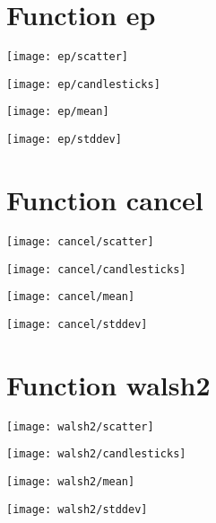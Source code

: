 \section{Function ep}
\begin{center}
\texttt{[image: ep/scatter]}
\end{center}
\begin{center}
\texttt{[image: ep/candlesticks]}
\end{center}
\begin{center}

\end{center}
\begin{center}
\texttt{[image: ep/mean]}
\end{center}
\begin{center}
\texttt{[image: ep/stddev]}
\end{center}
\newpage
\section{Function cancel}
\begin{center}
\texttt{[image: cancel/scatter]}
\end{center}
\begin{center}
\texttt{[image: cancel/candlesticks]}
\end{center}
\begin{center}

\end{center}
\begin{center}
\texttt{[image: cancel/mean]}
\end{center}
\begin{center}
\texttt{[image: cancel/stddev]}
\end{center}
\newpage
\section{Function walsh2}
\begin{center}
\texttt{[image: walsh2/scatter]}
\end{center}
\begin{center}
\texttt{[image: walsh2/candlesticks]}
\end{center}
\begin{center}

\end{center}
\begin{center}
\texttt{[image: walsh2/mean]}
\end{center}
\begin{center}
\texttt{[image: walsh2/stddev]}
\end{center}
